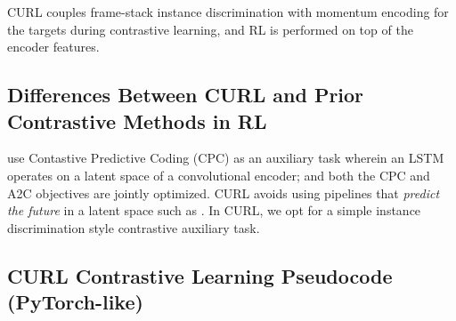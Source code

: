 CURL couples frame-stack instance discrimination with momentum encoding for the targets during contrastive learning, and RL is performed on top of the encoder features. 


\subsection{Differences Between CURL and Prior Contrastive Methods in RL}

\citet{oord2018representation} use Contastive Predictive Coding (CPC) as an auxiliary task wherein an LSTM operates on a latent space of a convolutional encoder; and both the CPC and A2C \cite{mnih2015human} objectives are jointly optimized. CURL avoids using pipelines that {\it predict the future} in a latent space such as \citet{oord2018representation, hafner2019dream}. In CURL, we opt for a simple instance discrimination style contrastive auxiliary task. 

\subsection{CURL Contrastive Learning Pseudocode (PyTorch-like)}\label{pytorch}




